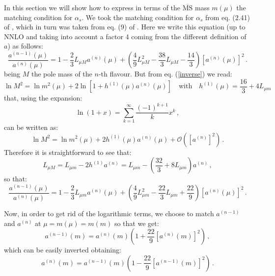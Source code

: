 \documentclass[10pt,a4paper]{article}
\begin{document}
In this section we will show how to express in terms of the $\overline{\mbox{MS}}$ mass $m(\mu)$ the matching condition for $\alpha_s$. We took the matching condition for $\alpha_s$ from eq. (2.41) of \cite{Vogt:2004ns}, which in turn was taken from eq. (9) of \cite{Chetyrkin:1997sg}.  Here we write this equation (up to NNLO and taking into account a factor 4 coming from the different definition of $a$) as follows:
\begin{equation}\label{alphaspole}
\frac{a^{(n-1)}(\mu)}{a^{(n)}(\mu)}=1-\frac23 L_{\mu M}a^{(n)}(\mu)+\left(\frac49L_{\mu M}^2-\frac{38}3L_{\mu M}-\frac{14}3\right)[a^{(n)}(\mu)]^2\,.
\end{equation}
being $M$ the pole mass of the $n$-th flavour. But from eq. (\ref{inverse}) we read:
\begin{equation}
\ln M^2 = \ln m^2(\mu) + 2\ln[1+h^{(1)}(\mu)a^{(n)}(\mu)]\quad\mbox{with}\quad h^{(1)}(\mu) = \frac{16}3+4L_{\mu m}
\end{equation}
that, using the expansion:
\begin{equation}
\ln(1+x)=\sum_{k=1}^{\infty}\frac{(-1)^{k+1}}{k}x^k\,,
\end{equation}
can be written as:
\begin{equation}\label{cacchiocacchio}
\ln M^2 = \ln m^2(\mu) + 2h^{(1)}(\mu)a^{(n)}(\mu)+\mathcal{O}([a^{(n)}]^2)\,.
\end{equation}
Therefore it is straightforward to see that:
\begin{equation}
L_{\mu M}  = L_{\mu m} - 2h^{(1)}a^{(n)}=L_{\mu m}-\left(\frac{32}3+8L_{\mu m}\right)a^{(n)}\,,
\end{equation}
so that:
\begin{equation}\label{alphasmsbar}
\frac{a^{(n-1)}(\mu)}{a^{(n)}(\mu)}=1-\frac23 L_{\mu m}a^{(n)}(\mu)+\left(\frac49L_{\mu m}^2-\frac{22}3L_{\mu m}+\frac{22}9\right)[a^{(n)}(\mu)]^2\,.
\end{equation}

Now, in order to get rid of the logarithmic terms, we choose to match $a^{(n-1)}$ and $a^{(n)}$ at $\mu=m(\mu)=m(m)$ so that we get:
\begin{equation}
a^{(n-1)}(m)=a^{(n)}(m)\left(1+\frac{22}9[a^{(n)}(m)]^2\right)\,,
\end{equation}
which can be easily inverted obtaining:
\begin{equation}\label{pollopollo}
a^{(n)}(m)=a^{(n-1)}(m)\left(1-\frac{22}9[a^{(n-1)}(m)]^2\right)\,.
\end{equation}
\end{document}

